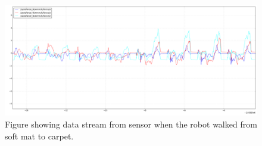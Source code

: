 \documentclass[USenglish]{ifimaster}  %
\begin{document}
	
	\begin{figure}[h]
		\centering
		\includegraphics[width=\textwidth,height=\textheight,keepaspectratio]{Figures/MM4Teppe2}
		\caption{Figure showing data stream from sensor when the robot walked from soft mat to carpet.}
		\label{fig:softcarpet}
	\end{figure}
	
	\begin{table}[h]
		\centering
		\caption{The table showing probability of each terrain per step walking from soft mat to carpet. Marked green represent correct prediction and correct terrain, red represent wrong prediction and yellow is the correct prediction if it got wrong.}
		\label{tab:softcarpet}
	\end{table}
	\FloatBarrier
\newpage
\end{document}
